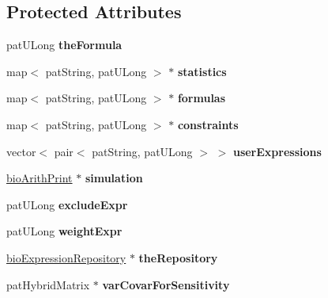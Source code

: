 \subsection*{Protected Attributes}
\begin{DoxyCompactItemize}
\item 
\mbox{\label{classbio_model_af9d612c741c87e6ef141ad8abba06211}} 
pat\+U\+Long {\bfseries the\+Formula}
\item 
\mbox{\label{classbio_model_ab7398fcb313641de3236f716f420148d}} 
map$<$ pat\+String, pat\+U\+Long $>$ $\ast$ {\bfseries statistics}
\item 
\mbox{\label{classbio_model_a7e5c522f6bf1eb29e9510c8459d6ca6a}} 
map$<$ pat\+String, pat\+U\+Long $>$ $\ast$ {\bfseries formulas}
\item 
\mbox{\label{classbio_model_addaf0ea38d819670e355bda57ef21b68}} 
map$<$ pat\+String, pat\+U\+Long $>$ $\ast$ {\bfseries constraints}
\item 
\mbox{\label{classbio_model_a3bfd0f095177a37ef4d7a98ff6027807}} 
vector$<$ pair$<$ pat\+String, pat\+U\+Long $>$ $>$ {\bfseries user\+Expressions}
\item 
\mbox{\label{classbio_model_ae639234ddf3d4afdd81e943b4ee4bdee}} 
\hyperlink{classbio_arith_print}{bio\+Arith\+Print} $\ast$ {\bfseries simulation}
\item 
\mbox{\label{classbio_model_a6e11bb0fd978811d9101fc0e5ed58201}} 
pat\+U\+Long {\bfseries exclude\+Expr}
\item 
\mbox{\label{classbio_model_a9011eb5179a5a31bdd7af2bf621204a0}} 
pat\+U\+Long {\bfseries weight\+Expr}
\item 
\mbox{\label{classbio_model_abd2710883cdd52d753b990596162b6c8}} 
\hyperlink{classbio_expression_repository}{bio\+Expression\+Repository} $\ast$ {\bfseries the\+Repository}
\item 
\mbox{\label{classbio_model_a219e2140b89a4df899f8b537211780a7}} 
pat\+Hybrid\+Matrix $\ast$ {\bfseries var\+Covar\+For\+Sensitivity}

\end{DoxyCompactItemize}
